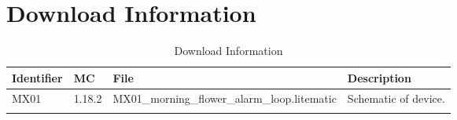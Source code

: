 \documentclass[10pt]{datasheet}
\begin{document}
\section{Download Information}
\begin{table}[h]
    \caption{Download Information}
    \begin{tabularx}{\textwidth}{l | l | l | X}
        \thickhline
        \textbf{Identifier} & \textbf{MC} & \textbf{File} & \textbf{Description} \\
        \hline
        MX01 & 1.18.2 & MX01\_morning\_flower\_alarm\_loop.litematic & Schematic of device. \\
        \hline
        \thickhline
    \end{tabularx}
\end{table}
\end{document}
